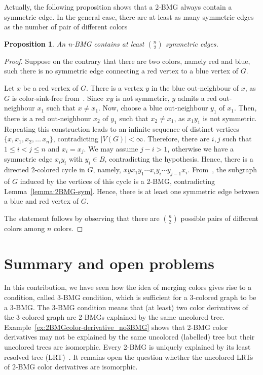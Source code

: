 \documentclass[final,3p,times]{elsarticle}
\newtheorem{proposition}[theorem]{Proposition}%
\begin{document}
Actually, the following proposition shows that a 2-BMG always contain a symmetric edge. In the general case, there are at least as many symmetric edges as the number of pair of different colors  
\begin{proposition}
An n-BMG contains at least $\binom{n}{2}$ symmetric edges.
\end{proposition}
\begin{proof}
Suppose on the contrary that there are two colors, namely red and blue, such there is no symmetric edge connecting a red vertex to a blue vertex of $G$.

Let $x$ be a red vertex of $G$. There is a vertex $y$ in the blue out-neighbour of $x$, as $G$ is color-sink-free from~\cite[Proposition~2.3]{korchmaros2021quasi}. Since $xy$ is not symmetric, $y$ admits a red out-neighbour $x_1$ such that $x\neq x_1$. Now, choose a blue out-neighbour $y_1$ of $x_1$. Then, there is a red out-neighbour $x_2$ of $y_1$ such that $x_2\neq x_1$, as $x_1y_1$ is not symmetric. Repeating this construction leads to an infinite sequence of distinct vertices $\{x,x_1,x_2,\ldots\,x_n\}$, contradicting $|V(G)|< \infty$. Therefore, there are $i,j$ such that $1\leq i<j\leq n$ and $x_i=x_j$. We may assume $j-i>1$, otherwise we have a symmetric edge $x_iy_i$ with $y_i\in B$, contradicting the hypothesis. Hence, there is a directed 2-colored cycle in $G$, namely, $xyx_1y_1\cdots x_iy_i\cdots y_{j-1}x_i$. From~\cite[Theorem~9]{schaller2021corrigendum}, the subgraph of $G$ induced by the vertices of this cycle is a 2-BMG, contradicting Lemma~\ref{lemma:2BMG-sym}. Hence, there is at least one symmetric edge between a blue and red vertex of $G$.

The statement follows by observing that there are $\binom{n}{2}$ possible pairs of different colors among $n$ colors. 
\end{proof}

\label{sec:cycles}
\section{Summary and open problems}
In this contribution, we have seen how the idea of merging colors gives rise to a condition, called 3-BMG condition, which is sufficient for a 3-colored graph to be a 3-BMG. The 3-BMG condition means that (at least) two color derivatives of the 3-colored graph are 2-BMGs explained by the same uncolored tree. Example~\ref{ex:2BMGcolor-derivative_no3BMG} shows that 2-BMG color derivatives may not be explained by the same uncolored (labelled) tree but their uncolored trees are isomorphic. Every 2-BMG is uniquely explained by its least resolved tree (LRT)~\cite[Theorem 8]{Geiss:19a}. It remains open the question whether the uncolored LRTs of 2-BMG color derivatives are isomorphic.
\end{document}
